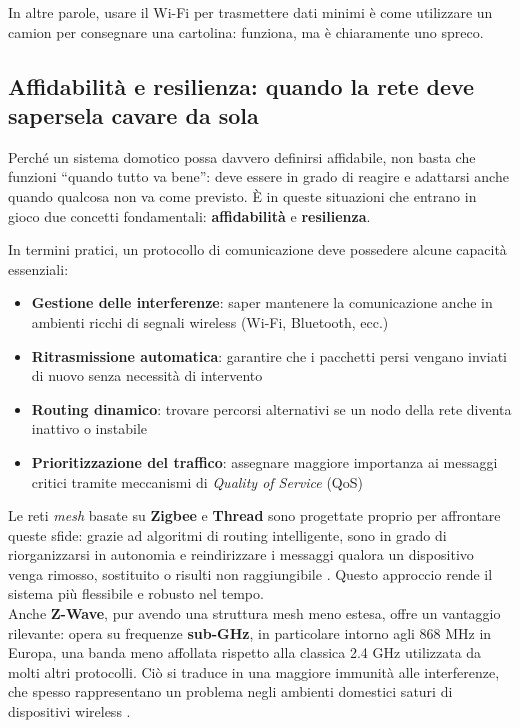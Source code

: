 In altre parole, usare il Wi-Fi per trasmettere dati minimi è come utilizzare un camion per consegnare una cartolina: funziona, ma è chiaramente uno spreco.

\vspace{0.5cm}

\subsection{Affidabilità e resilienza: quando la rete deve sapersela cavare da sola}

Perché un sistema domotico possa davvero definirsi affidabile, non basta che funzioni “quando tutto va bene”: deve essere in grado di reagire e adattarsi anche quando qualcosa non va come previsto. È in queste situazioni che entrano in gioco due concetti fondamentali: \textbf{affidabilità} e \textbf{resilienza}.

In termini pratici, un protocollo di comunicazione deve possedere alcune capacità essenziali:

\begin{itemize}
    \item \textbf{Gestione delle interferenze}: saper mantenere la comunicazione anche in ambienti ricchi di segnali wireless (Wi-Fi, Bluetooth, ecc.)
    \item \textbf{Ritrasmissione automatica}: garantire che i pacchetti persi vengano inviati di nuovo senza necessità di intervento
    \item \textbf{Routing dinamico}: trovare percorsi alternativi se un nodo della rete diventa inattivo o instabile
    \item \textbf{Prioritizzazione del traffico}: assegnare maggiore importanza ai messaggi critici tramite meccanismi di \textit{Quality of Service} (QoS)
\end{itemize}

Le reti \textit{mesh} basate su \textbf{Zigbee} e \textbf{Thread} sono progettate proprio per affrontare queste sfide: grazie ad algoritmi di routing intelligente, sono in grado di riorganizzarsi in autonomia e reindirizzare i messaggi qualora un dispositivo venga rimosso, sostituito o risulti non raggiungibile \cite{zigbee-spec,thread-spec}. Questo approccio rende il sistema più flessibile e robusto nel tempo.\\

Anche \textbf{Z-Wave}, pur avendo una struttura mesh meno estesa, offre un vantaggio rilevante: opera su frequenze \textbf{sub-GHz}, in particolare intorno agli 868 MHz in Europa, una banda meno affollata rispetto alla classica 2.4 GHz utilizzata da molti altri protocolli. Ciò si traduce in una maggiore immunità alle interferenze, che spesso rappresentano un problema negli ambienti domestici saturi di dispositivi wireless \cite{zwave-spec}.\\


